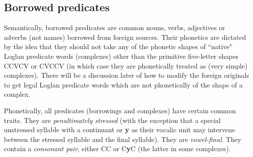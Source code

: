 \documentclass[12pt]{book}
\begin{document}
\subsection{Borrowed predicates}

Semantically, borrowed predicates are common nouns, verbs, adjectives or adverbs (not names) borrowed from foreign sources.  Their phonetics are dictated by the idea that they should not take any of the phonetic shapes of ``native" Loglan predicate words (complexes) other than the primitive five-letter shapes
CCVCV or CVCCV (in which case they are phonetically treated as (very simple) complexes).  There will be a discussion later of how to modify
the foreign originals to get legal Loglan predicate words which are not phonetically of the shape of a complex.

Phonetically, all predicates (borrowings and complexes) have certain common traits.  They are {\em penultimately stressed\/} (with the exception that a special unstressed syllable with a continuant or {\bf y} as their vocalic unit may intervene between the stressed syllable and the final syllable).  They are {\em vowel-final\/}.  They contain a {\em consonant pair\/}, either CC or C{\bf y}C (the latter in some complexes).
\end{document}
